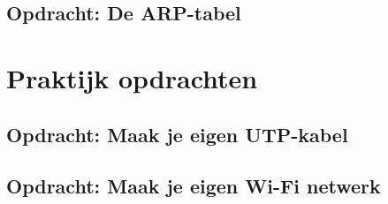 \documentclass[a4paper,12pt,twoside,openright,titlepage]{book}
\begin{document}
\section{Opdracht: De ARP-tabel}


\chapter{Praktijk opdrachten}
\section{Opdracht: Maak je eigen UTP-kabel}

\section{Opdracht: Maak je eigen Wi-Fi netwerk}


\printindex
\end{document}
